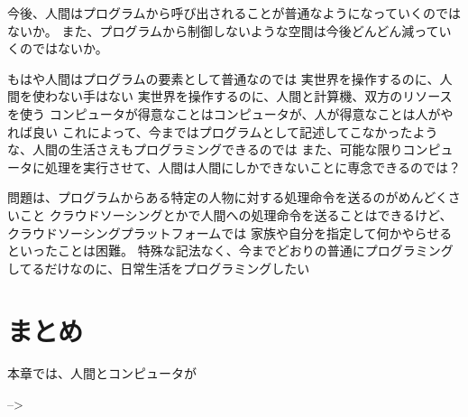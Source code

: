 今後、人間はプログラムから呼び出されることが普通なようになっていくのではないか。
また、プログラムから制御しないような空間は今後どんどん減っていくのではないか。

もはや人間はプログラムの要素として普通なのでは
実世界を操作するのに、人間を使わない手はない
実世界を操作するのに、人間と計算機、双方のリソースを使う
コンピュータが得意なことはコンピュータが、人が得意なことは人がやれば良い
これによって、今まではプログラムとして記述してこなかったような、人間の生活さえもプログラミングできるのでは
また、可能な限りコンピュータに処理を実行させて、人間は人間にしかできないことに専念できるのでは？

問題は、プログラムからある特定の人物に対する処理命令を送るのがめんどくさいこと
クラウドソーシングとかで人間への処理命令を送ることはできるけど、クラウドソーシングプラットフォームでは
家族や自分を指定して何かやらせるといったことは困難。
特殊な記法なく、今までどおりの普通にプログラミングしてるだけなのに、日常生活をプログラミングしたい

\section{まとめ}\label{ux307eux3068ux3081}

本章では、人間とコンピュータが

--\textgreater{}
